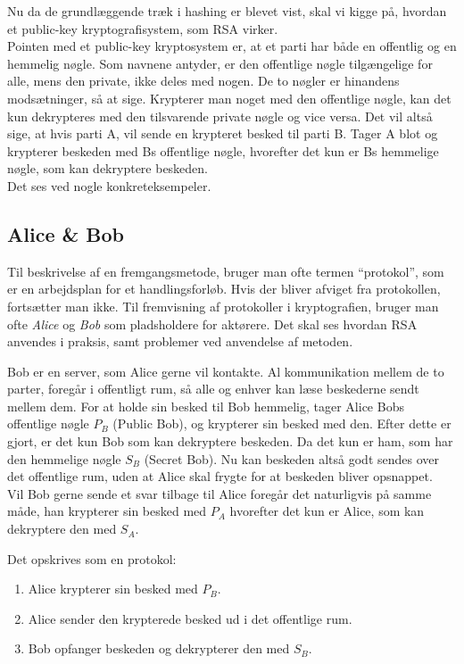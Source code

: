 Nu da de grundlæggende træk i hashing er blevet vist, skal vi kigge på, hvordan et public-key kryptografisystem, som RSA virker.\\
Pointen med et public-key kryptosystem er, at et parti har både en offentlig og en hemmelig nøgle.
Som navnene antyder, er den offentlige nøgle tilgængelige for alle, mens den private, ikke deles med nogen.
De to nøgler er hinandens modsætninger, så at sige.
Krypterer man noget med den offentlige nøgle, kan det kun dekrypteres med den tilsvarende private nøgle og vice versa.
Det vil altså sige, at hvis parti A, vil sende en krypteret besked til parti B. Tager A blot og krypterer beskeden med Bs offentlige nøgle, hvorefter det kun er Bs hemmelige nøgle, som kan dekryptere beskeden.\\
Det ses ved nogle konkreteksempeler.

\subsection{Alice \& Bob}
Til beskrivelse af en fremgangsmetode, bruger man ofte termen ``protokol'', som er en arbejdsplan for et handlingsforløb.
Hvis der bliver afviget fra protokollen, fortsætter man ikke.
Til fremvisning af protokoller i kryptografien, bruger man ofte \emph{Alice} og \emph{Bob} som pladsholdere for aktørere.
Det skal ses hvordan RSA anvendes i praksis, samt problemer ved anvendelse af metoden.

\begin{eks}
    \label{genrsa}
    Bob er en server, som Alice gerne vil kontakte.
    Al kommunikation mellem de to parter, foregår i offentligt rum, så alle og enhver kan læse beskederne sendt mellem dem.
    For at holde sin besked til Bob hemmelig, tager Alice Bobs offentlige nøgle \(P_B\) (Public Bob), og krypterer sin besked med den.
    Efter dette er gjort, er det kun Bob som kan dekryptere beskeden. Da det kun er ham, som har den hemmelige nøgle \(S_B\) (Secret Bob).
    Nu kan beskeden altså godt sendes over det offentlige rum, uden at Alice skal frygte for at beskeden bliver opsnappet.\\
    Vil Bob gerne sende et svar tilbage til Alice foregår det naturligvis på samme måde, han krypterer sin besked med \(P_A\) hvorefter det kun er Alice, som kan dekryptere den med \(S_A\).
    \par
    Det opskrives som en protokol:
    \begin{enumerate}[label*=(\arabic*)]%
        \item Alice krypterer sin besked med \(P_B\).
        \item Alice sender den krypterede besked ud i det offentlige rum.
        \item Bob opfanger beskeden og dekrypterer den med \(S_B\).
    \end{enumerate}
\end{eks}

